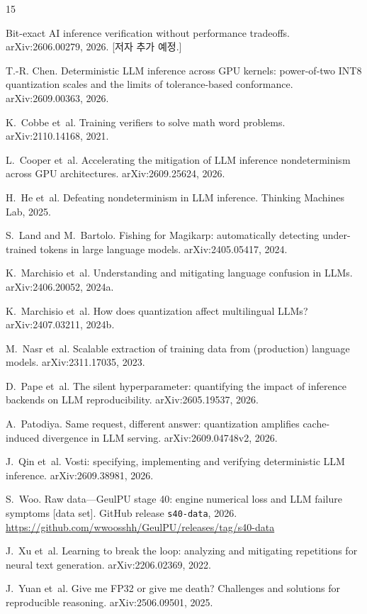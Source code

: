 \documentclass[11pt]{article}
\begin{document}
\begin{thebibliography}{15}

Bit-exact AI inference verification without performance tradeoffs. arXiv:2606.00279, 2026. [저자 추가 예정.]

T.-R. Chen. Deterministic LLM inference across GPU kernels: power-of-two INT8 quantization scales and the limits of
tolerance-based conformance. arXiv:2609.00363, 2026.

K.~Cobbe et~al. Training verifiers to solve math word problems. arXiv:2110.14168, 2021.

L.~Cooper et~al. Accelerating the mitigation of LLM inference nondeterminism across GPU architectures. arXiv:2609.25624,
2026.

H.~He et~al. Defeating nondeterminism in LLM inference. Thinking Machines Lab, 2025.

S.~Land and M.~Bartolo. Fishing for Magikarp: automatically detecting under-trained tokens in large language models.
arXiv:2405.05417, 2024.

K.~Marchisio et~al. Understanding and mitigating language confusion in LLMs. arXiv:2406.20052, 2024a.

K.~Marchisio et~al. How does quantization affect multilingual LLMs? arXiv:2407.03211, 2024b.

M.~Nasr et~al. Scalable extraction of training data from (production) language models. arXiv:2311.17035, 2023.

D.~Pape et~al. The silent hyperparameter: quantifying the impact of inference backends on LLM reproducibility.
arXiv:2605.19537, 2026.

A.~Patodiya. Same request, different answer: quantization amplifies cache-induced divergence in LLM serving.
arXiv:2609.04748v2, 2026.

J.~Qin et~al. Vosti: specifying, implementing and verifying deterministic LLM inference. arXiv:2609.38981, 2026.

S.~Woo. Raw data---GeulPU stage 40: engine numerical loss and LLM failure symptoms [data set]. GitHub release
\texttt{s40-data}, 2026. \url{https://github.com/wwoosshh/GeulPU/releases/tag/s40-data}

J.~Xu et~al. Learning to break the loop: analyzing and mitigating repetitions for neural text generation.
arXiv:2206.02369, 2022.

J.~Yuan et~al. Give me FP32 or give me death? Challenges and solutions for reproducible reasoning. arXiv:2506.09501, 2025.

\end{thebibliography}
\end{document}
